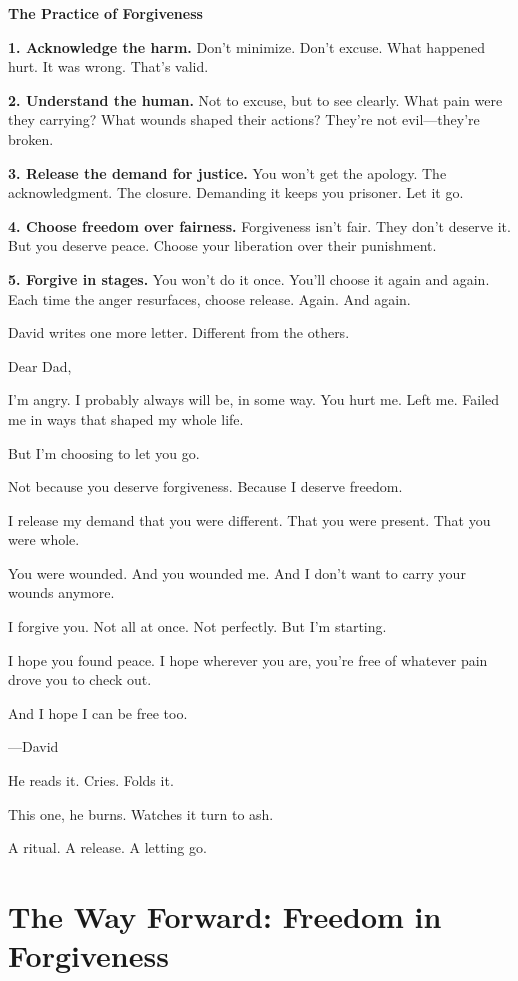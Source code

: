 \documentclass[11pt,twoside]{book}
\begin{document}
\begin{practicebox}
\textbf{The Practice of Forgiveness}

\textbf{1. Acknowledge the harm.} Don't minimize. Don't excuse. What happened hurt. It was wrong. That's valid.

\textbf{2. Understand the human.} Not to excuse, but to see clearly. What pain were they carrying? What wounds shaped their actions? They're not evil—they're broken.

\textbf{3. Release the demand for justice.} You won't get the apology. The acknowledgment. The closure. Demanding it keeps you prisoner. Let it go.

\textbf{4. Choose freedom over fairness.} Forgiveness isn't fair. They don't deserve it. But you deserve peace. Choose your liberation over their punishment.

\textbf{5. Forgive in stages.} You won't do it once. You'll choose it again and again. Each time the anger resurfaces, choose release. Again. And again.
\end{practicebox}

David writes one more letter. Different from the others.

Dear Dad,

I'm angry. I probably always will be, in some way. You hurt me. Left me. Failed me in ways that shaped my whole life.

But I'm choosing to let you go.

Not because you deserve forgiveness. Because I deserve freedom.

I release my demand that you were different. That you were present. That you were whole.

You were wounded. And you wounded me. And I don't want to carry your wounds anymore.

I forgive you. Not all at once. Not perfectly. But I'm starting.

I hope you found peace. I hope wherever you are, you're free of whatever pain drove you to check out.

And I hope I can be free too.

—David

He reads it. Cries. Folds it.

This one, he burns. Watches it turn to ash.

A ritual. A release. A letting go.

\section*{The Way Forward: Freedom in Forgiveness}
\end{document}
